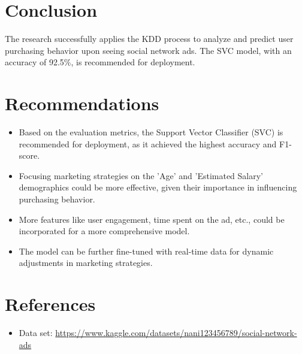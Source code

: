 \documentclass[12pt]{article}
\begin{document}
\section{Conclusion}
The research successfully applies the KDD process to analyze and predict user purchasing behavior upon seeing social network ads. The SVC model, with an accuracy of 92.5\%, is recommended for deployment.

\section{Recommendations}
\begin{itemize}
    \item Based on the evaluation metrics, the Support Vector Classifier (SVC) is recommended for deployment, as it achieved the highest accuracy and F1-score.
    \item Focusing marketing strategies on the 'Age' and 'Estimated Salary' demographics could be more effective, given their importance in influencing purchasing behavior.
    \item More features like user engagement, time spent on the ad, etc., could be incorporated for a more comprehensive model.
    \item  The model can be further fine-tuned with real-time data for dynamic adjustments in marketing strategies.
\end{itemize}

\section{References}
\begin{itemize}
    \item Data set: \url{https://www.kaggle.com/datasets/nani123456789/social-network-ads}
\end{itemize}
\end{document}
